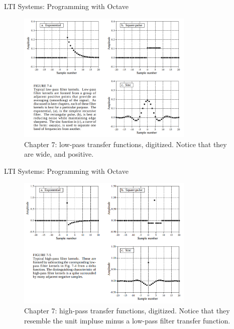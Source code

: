 \documentclass{beamer}
\begin{document}
\begin{frame}[fragile]{LTI Systems: Programming with Octave}
\small
\begin{figure}
\centering
\includegraphics[width=0.75\textwidth]{figures/kernel1.png}
\caption{\label{fig:kernel1} Chapter 7: low-pass transfer functions, digitized.  Notice that they are wide, and positive.}
\end{figure}
\end{frame}

\begin{frame}[fragile]{LTI Systems: Programming with Octave}
\small
\begin{figure}
\centering
\includegraphics[width=0.75\textwidth]{figures/kernel2.png}
\caption{\label{fig:kernel2} Chapter 7: high-pass transfer functions, digitized.  Notice that they resemble the unit impluse minus a low-pass filter transfer function.}
\end{figure}
\end{frame}
\end{document}
